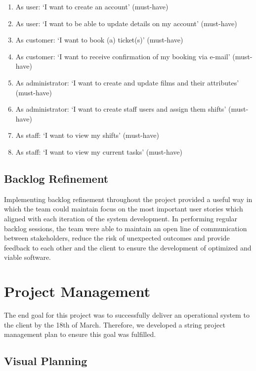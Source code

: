 \documentclass[11pt, english]{article}
\begin{document}
	\begin{enumerate}
        \setlength\itemsep{0cm}
		\item As user: `I want to create an account' (must-have)
		\item As user: `I want to be able to update details on my account' (must-have)
		\item As customer: `I want to book (a) ticket(s)' (must-have)
		\item As customer: `I want to receive confirmation of my booking via e-mail' (must-have)
		\item As administrator: `I want to create and update films and their attributes' (must-have)
		\item As administrator: `I want to create staff users and assign them shifts' (must-have)
		\item As staff: `I want to view my shifts' (must-have)
		\item As staff: `I want to view my current tasks' (must-have)
        \end{enumerate}

	\subsection{Backlog Refinement}

	Implementing backlog refinement throughout the project provided a useful way in which the team could maintain focus on the most important user stories which aligned with each iteration of the system development. In performing regular backlog sessions, the team were able to maintain an open line of communication between stakeholders, reduce the risk of unexpected outcomes and provide feedback to each other and the client to ensure the development of optimized and viable software.

\newpage

\section{Project Management}

	The end goal for this project was to successfully deliver an operational system to the client by the 18th of March. Therefore, we developed a string project management plan to ensure this goal was fulfilled.

	\subsection{Visual Planning}
\end{document}
